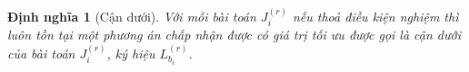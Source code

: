 \documentclass[12pt,a4paper]{report}
\newtheorem{dn}{Định nghĩa}
\newtheorem{ttoan}{Thuật toán}
\begin{document}
\begin{dn}[Cận dưới]
	Với mỗi bài toán $J_i^{(r)}$ nếu thoả điều kiện nghiệm thì luôn tồn tại một phương án chấp nhận được có giá trị tối ưu được gọi là cận dưới của bài toán $J_i^{(r)}$, ký hiệu $L_{b_i}^{(r)}$.
\end{dn}



























\end{document}
